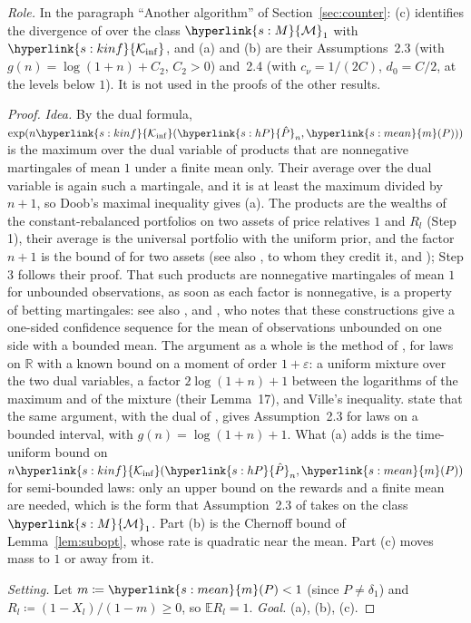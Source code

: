 \documentclass[11pt]{article}
\newcommand{\E}{\mathbb{E}}
\newcommand{\R}{\mathbb{R}}
\newcommand{\sy}[2]{{\hyperlink{#1}{#2}}}
\newcommand{\Mm}{\sy{s:M}{\mathcal{M}}}
\newcommand{\mean}{\sy{s:mean}{m}}
\newcommand{\Kinf}{\sy{s:kinf}{\mathcal{K}_{\inf}}}
\newcommand{\hP}{\sy{s:hP}{\hat{P}}}
\begin{document}
\emph{Role.} In the paragraph ``Another algorithm'' of Section~\ref{sec:counter}: (c) identifies the
divergence of \citet{PA26} over the class $\Mm_1$ with $\Kinf$, and (a) and (b) are their
Assumptions~2.3 (with $g(n)=\log(1+n)+C_2$, $C_2>0$) and~2.4 (with $c_\nu=1/(2C)$, $d_0=C/2$, at the
levels below $1$). It is not used in the proofs of the other results.

\begin{proof}
\emph{Idea.} By the dual formula, $\exp(n\Kinf(\hP_n,\mean(P)))$ is the maximum over the dual variable
of products that are nonnegative martingales of mean $1$ under a finite mean only. Their average over
the dual variable is again such a martingale, and it is at least the maximum divided by $n+1$, so
Doob's maximal inequality gives (a). The products are the wealths of the constant-rebalanced
portfolios on two assets of price relatives $1$ and $R_l$ (Step 1), their average is the universal
portfolio with the uniform prior, and the factor $n+1$ is the bound of \citet[Theorem~1]{BK99} for
two assets (see also \citealp{CO96}, to whom they credit it, and \citealp{Cov91}); Step 3 follows
their proof.
That such products are nonnegative martingales of mean $1$ for unbounded observations, as soon as
each factor is nonnegative, is a property of betting martingales: see also
\citet[Proposition~3 in arXiv v7]{WSR24}, and \citet[Section~2]{Min22}, who notes that these
constructions give a one-sided confidence sequence for the mean of observations unbounded on one
side with a bounded mean. The argument as a whole is the method of
\citet[Proposition~5, proof in Appendix~B.4.1]{AJK21}, for laws on $\R$ with a known bound on a
moment of order $1+\varepsilon$: a uniform mixture over the two dual variables, a factor
$2\log(1+n)+1$ between the logarithms of the maximum and of the mixture (their Lemma~17), and
Ville's inequality. \citet[Appendix~A.1]{PA26} state that the same argument, with the dual of
\citet{HT10}, gives Assumption~2.3 for laws on a bounded interval, with $g(n)=\log(1+n)+1$. What (a)
adds is the time-uniform bound on $n\Kinf(\hP_n,\mean(P))$ for semi-bounded laws: only an upper
bound on the rewards and a finite mean are needed, which is the form that Assumption~2.3 of
\citet{PA26} takes on the class $\Mm_1$.
Part (b) is the Chernoff bound
of Lemma~\ref{lem:subopt}, whose rate is quadratic near the mean. Part (c) moves mass to $1$ or away
from it.

\emph{Setting.} Let $m\coloneqq\mean(P)<1$ (since $P\ne\delta_1$) and
$R_l\coloneqq(1-X_l)/(1-m)\ge0$, so $\E R_l=1$. \emph{Goal.} (a), (b), (c).


\end{proof}
\end{document}
